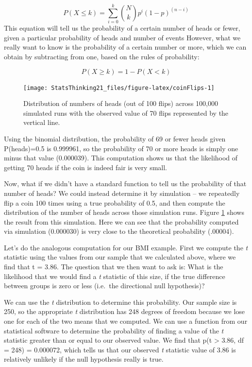\documentclass[12pt,]{book}
\theoremstyle{definition}
\theoremstyle{definition}
\theoremstyle{definition}
\theoremstyle{remark}
\begin{document}
\[
P(X \le k) = \sum_{i=0}^k \binom{N}{k} p^i (1-p)^{(n-i)}
\]
This equation will tell us the probability of a certain number of heads or fewer, given a particular probability of heads and number of events However, what we really want to know is the probability of a certain number or more, which we can obtain by subtracting from one, based on the rules of probability:

\[
P(X \ge k) = 1 - P(X < k)
\]

\begin{figure}
\texttt{[image: StatsThinking21\_files/figure-latex/coinFlips-1]} \caption{Distribution of numbers of heads (out of 100 flips) across 100,000 simulated runs with the observed value of 70 flips represented by the vertical line.}\label{fig:coinFlips}
\end{figure}

Using the binomial distribution, the probability of 69 or fewer heads given P(heads)=0.5 is 0.999961, so the probability of 70 or more heads is simply one minus that value (0.000039).
This computation shows us that the likelihood of getting 70 heads if the coin is indeed fair is very small.

Now, what if we didn't have a standard function to tell us the probability of that number of heads? We could instead determine it by simulation -- we repeatedly flip a coin 100 times using a true probability of 0.5, and then compute the distribution of the number of heads across those simulation runs. Figure \ref{fig:coinFlips} shows the result from this simulation. Here we can see that the probability computed via simulation (0.000030) is very close to the theoretical probability (.00004).

Let's do the analogous computation for our BMI example. First we compute the \emph{t} statistic using the values from our sample that we calculated above, where we find that t = 3.86. The question that we then want to ask is: What is the likelihood that we would find a \emph{t} statistic of this size, if the true difference between groups is zero or less (i.e.~the directional null hypothesis)?

We can use the \emph{t} distribution to determine this probability. Our sample size is 250, so the appropriate \emph{t} distribution has 248 degrees of freedom because we lose one for each of the two means that we computed. We can use a function from our statistical software to determine the probability of finding a value of the \emph{t} statistic greater than or equal to our observed value. We find that p(t \textgreater{} 3.86, df = 248) = 0.000072, which tells us that our observed \emph{t} statistic value of 3.86 is relatively unlikely if the null hypothesis really is true.
\end{document}
